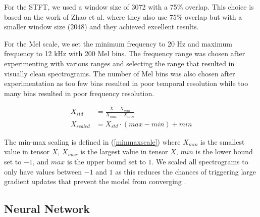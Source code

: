 \documentclass[a4paper, 10pt, conference]{ieeeconf}      %
\begin{document}
For the STFT, we used a window size of 3072 with a 75\% overlap. This choice is based on the work of Zhao et al. \cite{Zhao2019} where they also use 75\% overlap but with a smaller window size (2048) and they achieved excellent results. 

For the Mel scale, we set the minimum frequency to 20 Hz and maximum frequency to 12 kHz with 200 Mel bins. The frequency range was chosen after experimenting with various ranges and selecting the range that resulted in visually clean spectrograms. The number of Mel bins was also chosen after experimentation as too few bins resulted in poor temporal resolution while too many bins resulted in poor frequency resolution.

\begin{equation}
	\label{minmaxscale}
	\begin{aligned}
		X_{std} &= \frac{X - X_{min}}{X_{max} - X_{min}}\\
		X_{scaled} &= X_{std} \cdot  (max - min) + min
	\end{aligned}
\end{equation}

The min-max scaling is defined in (\ref{minmaxscale}) where $X_{min}$ is the smallest value in tensor $X$, $X_{max}$ is the largest value in tensor $X$, $min$ is the lower bound set to $-1$, and $max$ is the upper bound set to $1$. We scaled all spectrograms to only have values between $-1$ and $1$ as this reduces the chances of triggering large gradient updates that prevent the model from converging \cite{Chollet2017}.


\subsection{Neural Network}

\end{document}
